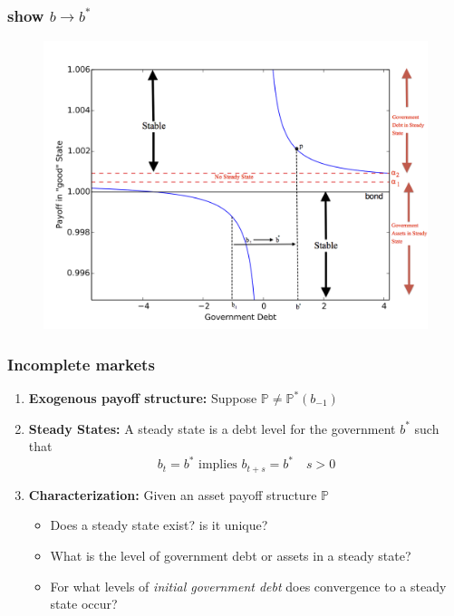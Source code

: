 \documentclass{beamer}
\begin{document}
\begin{frame}
   \frametitle{show $b\to b^*$ }
	\begin{figure}
		\begin{center}
		\includegraphics[scale=.5]{Images/graph.png}
	\end{center}	
	\end{figure}

  \end{frame}
 
% 
\begin{frame}
	\frametitle{Incomplete markets }
	\begin{enumerate}
		\item  \textbf{Exogenous payoff structure:} Suppose $\mathbb{P}\neq \mathbb{P}^*(b_{-1})$
		
		\item \textbf{Steady States: } A steady state is a debt level for the government $b^*$ such that 
		\[b_{t}=b^* \text{ implies } b_{t+s}=b^*\quad s>0\]
	
			
		\item \textbf{Characterization: } Given an asset payoff structure $\mathbb{P}$
		\begin{itemize}
			\item Does a steady state exist? is it unique?
			\item What is the level of government debt or   assets in a steady state?
			\item For what levels of  \emph{initial government debt} does  convergence to a steady state occur?
 			\end{itemize}
	\end{enumerate}
\end{frame}
\end{document}
